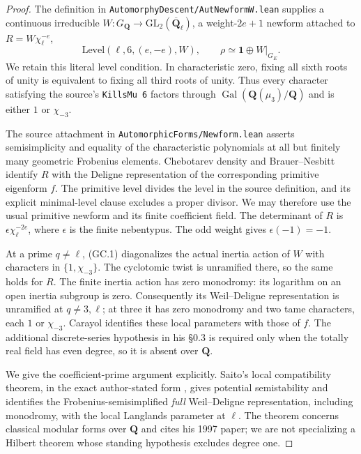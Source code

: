 \begin{proof}
The definition in
\texttt{AutomorphyDescent/AutNewformW.lean} supplies a continuous
irreducible $W:G_{\mathbf Q}\to\mathrm{GL}_2(\overline{\mathbf Q}_\ell)$,
a weight-$2e+1$ newform attached to $R=W\chi_\ell^{-e}$,
\[
 \mathrm{Level}(\ell,6,(e,-e),W),
 \qquad \rho\simeq\mathbf1\oplus W|_{G_E}.
 \tag{GC.1}
\]
We retain this literal level condition. In characteristic zero, fixing
all sixth roots of unity is equivalent to fixing all third roots of
unity. Thus every character satisfying the source's
\texttt{KillsMu 6} factors through
$\operatorname{Gal}(\mathbf Q(\mu_3)/\mathbf Q)$ and is either
$1$ or $\chi_{-3}$.

The source attachment in \texttt{AutomorphicForms/Newform.lean}
asserts semisimplicity and equality of the characteristic polynomials
at all but finitely many geometric Frobenius elements. Chebotarev
density and Brauer--Nesbitt identify $R$ with the Deligne representation
of the corresponding primitive eigenform $f$. The primitive level divides
the level in the source definition, and its explicit minimal-level clause
excludes a proper divisor. We may therefore use the usual primitive
newform and its finite coefficient field. The determinant of $R$ is
$\epsilon\chi_\ell^{-2e}$, where $\epsilon$ is the finite nebentypus.
The odd weight gives $\epsilon(-1)=-1$.

At a prime $q\ne\ell$, (GC.1) diagonalizes the actual inertia action of
$W$ with characters in $\{1,\chi_{-3}\}$. The cyclotomic twist is
unramified there, so the same holds for $R$. The finite inertia action
has zero monodromy: its logarithm on an open inertia subgroup is zero.
Consequently its Weil--Deligne representation is unramified at
$q\ne3,\ell$; at three it has zero monodromy and two tame characters,
each $1$ or $\chi_{-3}$. Carayol
\cite[\S0.7, Theorem~A, pp.~410--411]{K17Carayol1986}
identifies these local parameters with those of $f$. The additional
discrete-series hypothesis in his \S0.3 is required only when the
totally real field has even degree, so it is absent over $\mathbf Q$.

We give the coefficient-prime argument explicitly. Saito's
local compatibility theorem, in the exact author-stated form
\cite[\S2c, Theorem~3, p.~9; definitions on pp.~7--8]{K17SaitoSurvey},
gives potential semistability and identifies the Frobenius-semisimplified
\emph{full} Weil--Deligne representation, including monodromy, with the
local Langlands parameter at $\ell$. The theorem concerns classical
modular forms over $\mathbf Q$ and cites his 1997 paper; we are not
specializing a Hilbert theorem whose standing hypothesis excludes degree
one.


\end{proof}
